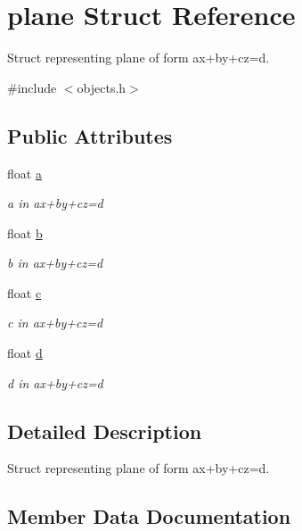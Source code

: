 \hypertarget{structplane}{}\section{plane Struct Reference}
\label{structplane}


Struct representing plane of form ax+by+cz=d.  




{\ttfamily \#include $<$objects.\+h$>$}

\subsection*{Public Attributes}
\begin{DoxyCompactItemize}
\item 
float \mbox{\hyperlink{structplane_a93c319b577955eca012b2866db926c1f}{a}}
\begin{DoxyCompactList}\small\item\em a in ax+by+cz=d \end{DoxyCompactList}\item 
float \mbox{\hyperlink{structplane_af4a97d4328067448317dd787e048bc70}{b}}
\begin{DoxyCompactList}\small\item\em b in ax+by+cz=d \end{DoxyCompactList}\item 
float \mbox{\hyperlink{structplane_a3024e149a5b2cb4697fa71ae7d539bd1}{c}}
\begin{DoxyCompactList}\small\item\em c in ax+by+cz=d \end{DoxyCompactList}\item 
float \mbox{\hyperlink{structplane_a9a3cb65698785bad8199e7afbd083e27}{d}}
\begin{DoxyCompactList}\small\item\em d in ax+by+cz=d \end{DoxyCompactList}\end{DoxyCompactItemize}


\subsection{Detailed Description}
Struct representing plane of form ax+by+cz=d. 

\subsection{Member Data Documentation}
\mbox{\label{structplane_a93c319b577955eca012b2866db926c1f}} 
